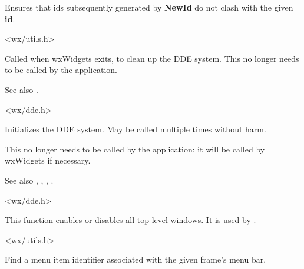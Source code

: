 \label{wxregisterid}


Ensures that ids subsequently generated by {\bf NewId} do not clash with
the given {\bf id}.


<wx/utils.h>


\label{wxddecleanup}


Called when wxWidgets exits, to clean up the DDE system. This no longer needs to be
called by the application.

See also .


<wx/dde.h>


\label{wxddeinitialize}


Initializes the DDE system. May be called multiple times without harm.

This no longer needs to be called by the application: it will be called
by wxWidgets if necessary.

See also , , ,\rtfsp
{}.


<wx/dde.h>


\label{wxenabletoplevelwindows}


This function enables or disables all top level windows. It is used by
.


<wx/utils.h>


\label{wxfindmenuitemid}


Find a menu item identifier associated with the given frame's menu bar.

